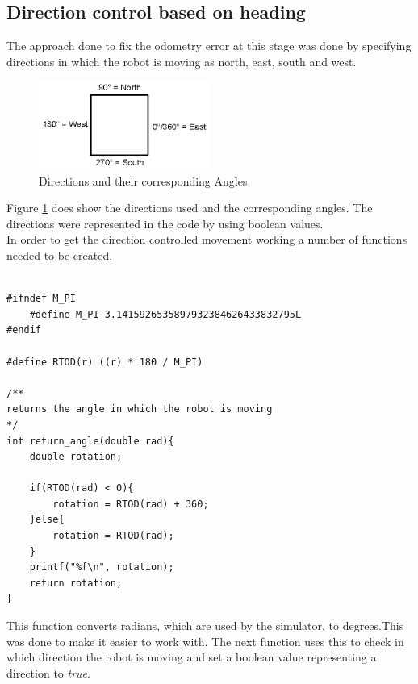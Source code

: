 \subsection{Direction control based on heading}
The approach done to fix the odometry error at this stage was done by specifying directions in which the robot is moving as north, east, south and west. 

\begin{figure}[h]
\centering
\includegraphics[width = 0.5\textwidth]{../../figures/direction_and_angles} 
\caption{Directions and their corresponding Angles}
\label{directions_and_angles}
\end{figure}

Figure \ref{directions_and_angles} does show the directions used and the corresponding angles. The directions were represented in the code by using boolean values. \\
In order to get the direction controlled movement working a number of functions needed to be created.  

\begin{lstlisting}[caption={Converting Radians to degrees}]

#ifndef M_PI
	#define M_PI 3.1415926535897932384626433832795L
#endif

#define RTOD(r) ((r) * 180 / M_PI)

/**
returns the angle in which the robot is moving
*/
int return_angle(double rad){
	double rotation;

	if(RTOD(rad) < 0){
		rotation = RTOD(rad) + 360;
	}else{
		rotation = RTOD(rad);
	}
	printf("%f\n", rotation);
	return rotation;
}
\end{lstlisting}

This function converts radians, which are used by the simulator, to degrees.This was done to make it easier to work with.
The next function uses this to check in which direction the robot is moving and set a boolean value representing a direction to \textit{true}.


